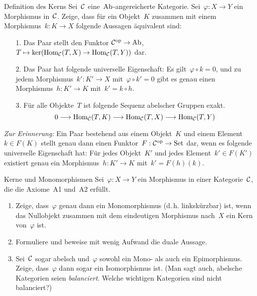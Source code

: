 \documentclass{uebblatt}
\begin{document}

\begin{aufgabe}{Definition des Kerns}
Sei~$\mathcal{C}$ eine~$\mathrm{Ab}$-angereicherte Kategorie. Sei~$\varphi : X \to Y$ ein
Morphismus in~$\mathcal{C}$. Zeige, dass für ein Objekt~$K$ zusammen mit einem Morphismus~$k
: K \to X$ folgende Aussagen äquivalent sind:
\begin{enumerate}
\item[1.] Das Paar stellt den Funktor
$\mathcal{C}^{\mathrm{op}} \to \mathrm{Ab}$, $T \mapsto
  \operatorname{ker}(\mathrm{Hom}_{\mathcal{C}}(T,X) \to \mathrm{Hom}_{\mathcal{C}}(T,Y))$ dar.
\item[2.] Das Paar hat folgende universelle Eigenschaft:
Es gilt~$\varphi \circ k = 0$, und zu jedem
Morphismus~$k' : K' \to X$ mit~$\varphi \circ k' = 0$ gibt es genau einen
Morphismus~$h : K' \to K$ mit~$k' = k \circ h$.
\item[3.] Für alle Objekte~$T$ ist folgende Sequenz abelscher Gruppen
exakt.
\[ 0 \longrightarrow \mathrm{Hom}_{\mathcal{C}}(T,K) \longrightarrow \mathrm{Hom}_{\mathcal{C}}(T,X)
  \longrightarrow \mathrm{Hom}_{\mathcal{C}}(T,Y) \]
\end{enumerate}

{\tiny\emph{Zur Erinnerung:} Ein Paar bestehend aus einem Objekt~$K$ und einem
Element~$k \in F(K)$ stellt genau dann einen Funktor~$F : \mathcal{C}^{\mathrm{op}} \to \mathrm{Set}$ dar,
wenn es folgende universelle Eigenschaft hat: Für jedes Objekt~$K'$ und jedes
Element~$k' \in F(K')$ existiert genau ein Morphismus~$h : K' \to K$ mit~$k' =
F(h)(k)$.\par}
\end{aufgabe}

\begin{aufgabe}{Kerne und Monomorphismen}
Sei~$\varphi : X \to Y$ ein Morphismus in einer Kategorie~$\mathcal{C}$, die die Axiome~A1
und~A2 erfüllt.
\begin{enumerate}
\item Zeige, dass~$\varphi$ genau dann ein Monomorphismus (d.\,h.
linkskürzbar) ist, wenn das Nullobjekt zusammen mit dem eindeutigen
Morphismus nach~$X$ ein Kern von~$\varphi$ ist.
\item Formuliere und beweise mit wenig Aufwand die duale Aussage.
\item Sei~$\mathcal{C}$ sogar abelsch und~$\varphi$ sowohl ein Mono- als auch ein
Epimorphismus. Zeige, dass~$\varphi$ dann sogar ein Isomorphismus ist.
(Man sagt auch, abelsche Kategorien seien \emph{balanciert}. Welche wichtigen
Kategorien sind nicht balanciert?)
\end{enumerate}
\end{aufgabe}
\end{document}
